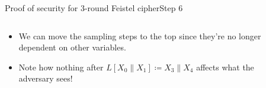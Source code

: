 \documentclass[aspectratio=169, lualatex, handout]{beamer}
\begin{document}
\begin{frame}{Proof of security for 3-round Feistel cipher}{Step 6}
	\begin{columns}[c]
		\begin{column}{0.5\textwidth}
			\begin{itemize}[<+->]
				\item We can move the sampling steps to the top since they're no longer dependent on other variables.
				\item Note how nothing after $L[X_0\|X_1] \coloneq X_3\|X_4$ affects what the adversary sees!
			\end{itemize}
		\end{column}
		\begin{column}{0.5\textwidth}
			\vspace{-1.5cm}
			\begin{center}
			\end{center}
		\end{column}
	\end{columns}
\end{frame}
\end{document}
